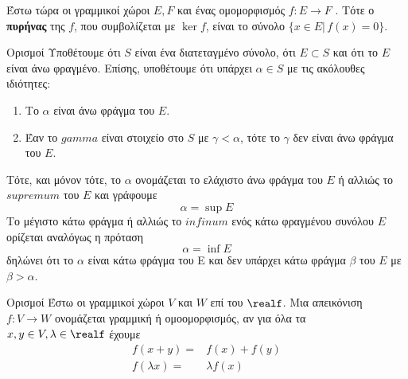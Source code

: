 
    Έστω τώρα οι γραμμικοί χώροι $E,F$ και ένας ομομορφισμός  $f:E\rightarrow F$
    . Τότε ο \textbf{πυρήνας} της $f$, που συμβολίζεται με $\ker f$, είναι το 
    σύνολο $\{x\in E |\,f(x) = 0\}$.


\begin{nameddefn}{Ορισμοί}
    Υποθέτουμε ότι $S$ είναι ένα διατεταγμένο σύνολο, ότι $E\subset S$ και ότι 
    το $E$ είναι άνω φραγμένο. Επίσης, υποθέτουμε ότι υπάρχει $\alpha \in S$ με
    τις ακόλουθες ιδιότητες:
    \begin{enumerate}
        \item Το $\alpha$ είναι άνω φράγμα του $E$.
        \item Έαν το $gamma$ είναι στοιχείο στο $S$ με $\gamma < \alpha$, τότε 
        το $\gamma$ δεν είναι άνω φράγμα του $E$. 
    \end{enumerate}
    Τότε, και μόνον τότε, το $\alpha$ ονομάζεται το ελάχιστο άνω φράγμα του $E$
    ή αλλιώς το $supremum$  του $E$ και γράφουμε 
    \begin{equation*}
        \alpha = \sup E
    \end{equation*} 
    Το μέγιστο κάτω φράγμα ή αλλιώς το $infinum$ ενός κάτω φραγμένου συνόλου $E$
    ορίζεται αναλόγως η πρόταση
    \begin{equation*}
        \alpha = \inf E
    \end{equation*}
    δηλώνει ότι το $\alpha$ είναι κάτω φράγμα του E και δεν υπάρχει κάτω φράγμα
    $\beta$ του $E$ με $\beta > \alpha$.
\end{nameddefn}


\begin{nameddefn}{Ορισμοί}
    Έστω οι γραμμικοί χώροι $V$ και $W$ επί του $\realf$. Μια απεικόνιση $f:V
    \rightarrow W$ ονομάζεται γραμμική ή ομοομορφισμός, αν για όλα τα $x, y \in
    V, \lambda \in \realf$ έχουμε
    \begin{align*}
        f(x+y) =& f(x) + f(y)\\
        f(\lambda x) =& \lambda f(x)
    \end{align*}
\end{nameddefn}